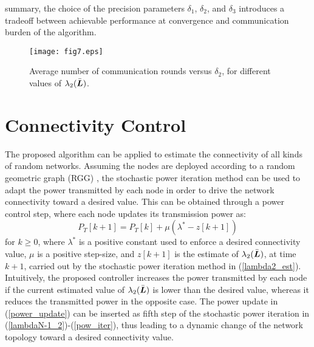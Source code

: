 \documentclass[10pt,twocolumn]{IEEEtran}
\def\bL{\mbox{\boldmath $L$}}
\begin{document}
summary, the choice of the precision parameters $\delta_1$, $\delta_2$, and $\delta_3$ introduces a tradeoff between achievable performance at convergence and communication burden of the algorithm.
\begin{figure}[t]
\centering
\texttt{[image: fig7.eps]}
  \caption{Average number of communication rounds versus $\delta_2$, for different values of $\lambda_2(\bar{\bL})$.}\label{Iter_delta}
\end{figure}

\section{Connectivity Control}

The proposed algorithm can be applied to estimate the connectivity of all kinds of random networks. Assuming the nodes are deployed according to a random geometric graph (RGG) \cite{Penrose}, the stochastic power iteration method can be used to adapt the power transmitted by each node in order to drive the network connectivity toward a desired value. This can be obtained through a power control step, where each node updates its transmission power as:
\begin{equation}\label{power_update}
P_T[k+1]=P_T[k]+\mu\left(\lambda^*-z[k+1]\right)
\end{equation}
for $k\geq0$, where $\lambda^*$ is a positive constant used to enforce a desired connectivity value, $\mu$ is a positive step-size, and $z[k+1]$ is the estimate of $\lambda_2(\bar{\bL})$, at time $k+1$, carried out by the stochastic power iteration method in (\ref{lambda2_est}). Intuitively, the proposed controller increases the power transmitted by each node if the current estimated value of $\lambda_2(\bar{\bL})$ is lower than the desired value, whereas it reduces the transmitted power in the opposite case.
The power update in (\ref{power_update}) can be inserted as fifth step of the stochastic power iteration in (\ref{lambdaN-1_2})-(\ref{pow_iter}), thus leading to a dynamic change of the network topology toward a desired connectivity value.
\end{document}
